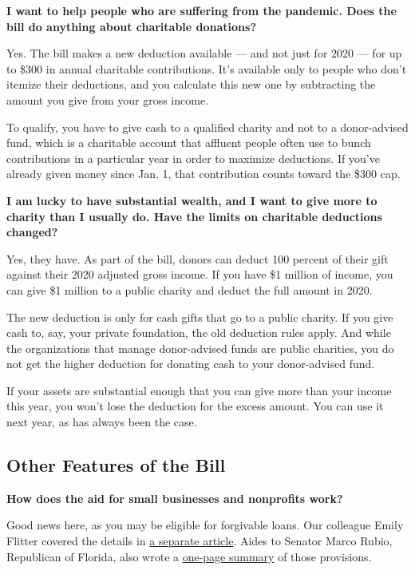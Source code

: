 \textbf{I want to help people who are suffering from the pandemic. Does
the bill do anything about charitable donations?}

Yes. The bill makes a new deduction available --- and not just for 2020
--- for up to \$300 in annual charitable contributions. It's available
only to people who don't itemize their deductions, and you calculate
this new one by subtracting the amount you give from your gross income.

To qualify, you have to give cash to a qualified charity and not to a
donor-advised fund, which is a charitable account that affluent people
often use to bunch contributions in a particular year in order to
maximize deductions. If you've already given money since Jan. 1, that
contribution counts toward the \$300 cap.

\textbf{I am lucky to have substantial wealth, and I want to give more
to charity than I usually do. Have the limits on charitable deductions
changed?}

Yes, they have. As part of the bill, donors can deduct 100 percent of
their gift against their 2020 adjusted gross income. If you have \$1
million of income, you can give \$1 million to a public charity and
deduct the full amount in 2020.

The new deduction is only for cash gifts that go to a public charity. If
you give cash to, say, your private foundation, the old deduction rules
apply. And while the organizations that manage donor-advised funds are
public charities, you do not get the higher deduction for donating cash
to your donor-advised fund.

If your assets are substantial enough that you can give more than your
income this year, you won't lose the deduction for the excess amount.
You can use it next year, as has always been the case.

\hypertarget{other-features-of-the-bill}{%
\subsection{Other Features of the
Bill}\label{other-features-of-the-bill}}

\textbf{How does the aid for small businesses and nonprofits work?}

Good news here, as you may be eligible for forgivable loans. Our
colleague Emily Flitter covered the details in
\href{https://www.nytimes.com/2020/03/26/business/coronavirus-stimulus-small-business.html}{a
separate article}. Aides to Senator Marco Rubio, Republican of Florida,
also wrote a
\href{https://www.rubio.senate.gov/public/_cache/files/28e8263e-e7d4-4da7-a67b-077c54ba4220/9F7B494B2E355791B24536DC2162CF16.final-one-pager-keeping-american-workers-paid-and-employed-act-.pdf}{one-page
summary} of those provisions.

